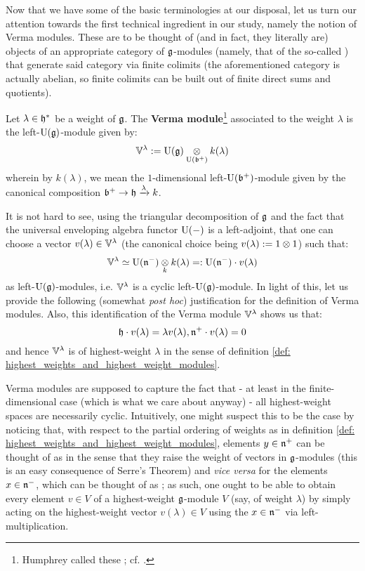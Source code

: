         Now that we have some of the basic terminologies at our disposal, let us turn our attention towards the first technical ingredient in our study, namely the notion of Verma modules. These are to be thought of (and in fact, they literally are) objects of an appropriate category of $\mathfrak{g}$-modules (namely, that of the so-called ) that generate said category via finite colimits (the aforementioned category is actually abelian, so finite colimits can be built out of finite direct sums and quotients).
        \begin{definition} \label{def: verma_modules}
            Let $\lambda \in \mathfrak{h}^*$ be a weight of $\mathfrak{g}$. The \textbf{Verma module}\footnote{Humphrey called these ; cf. \cite[Subsection 20.2]{humphreys_lie_algebras}.} associated to the weight $\lambda$ is the left-$\mathrm{U}(\mathfrak{g})$-module given by:
                $$\V^{\lambda} := \rmU(\g) \tensor_{\rmU(\b^+)} k(\lambda)$$
            wherein by $k(\lambda)$, we mean the $1$-dimensional left-$\mathrm{U}(\mathfrak{b}^+)$-module given by the canonical composition $\mathfrak{b}^+ \to \mathfrak{h} \xrightarrow[]{\lambda} k$.
        \end{definition}
        \begin{remark}
            It is not hard to see, using the triangular decomposition of $\mathfrak{g}$ and the fact that the universal enveloping algebra functor $\mathrm{U}(-)$ is a left-adjoint, that one can choose a vector $v(\lambda) \in \mathbb{V}^{\lambda}$ (the canonical choice being $v(\lambda) := 1 \tensor 1$) such that:
                $$\V^{\lambda} \cong \rmU(\n^-) \tensor_k k(\lambda) =: \rmU(\n^-) \cdot v(\lambda)$$
            as left-$\mathrm{U}(\mathfrak{g})$-modules, i.e. $\mathbb{V}^{\lambda}$ is a cyclic left-$\mathrm{U}(\mathfrak{g})$-module. In light of this, let us provide the following (somewhat \textit{post hoc}) justification for the definition of Verma modules. Also, this identification of the Verma module $\mathbb{V}^{\lambda}$ shows us that:
                $$\mathfrak{h} \cdot v(\lambda) = \lambda v(\lambda), \mathfrak{n}^+ \cdot v(\lambda) = 0$$
            and hence $\mathbb{V}^{\lambda}$ is of highest-weight $\lambda$ in the sense of definition \ref{def: highest_weights_and_highest_weight_modules}.
        
            Verma modules are supposed to capture the fact that - at least in the finite-dimensional case (which is what we care about anyway) - all highest-weight spaces are necessarily cyclic. Intuitively, one might suspect this to be the case by noticing that, with respect to the partial ordering of weights as in definition \ref{def: highest_weights_and_highest_weight_modules}, elements $y \in \mathfrak{n}^+$ can be thought of as  in the sense that they raise the weight of vectors in $\mathfrak{g}$-modules (this is an easy consequence of Serre's Theorem) and \textit{vice versa} for the elements $x \in \mathfrak{n}^-$, which can be thought of as ; as such, one ought to be able to obtain every element $v \in V$ of a highest-weight $\mathfrak{g}$-module $V$ (say, of weight $\lambda$) by simply acting on the highest-weight vector $v(\lambda) \in V$ using the  $x \in \mathfrak{n}^-$ via left-multiplication.
        \end{remark}
        
